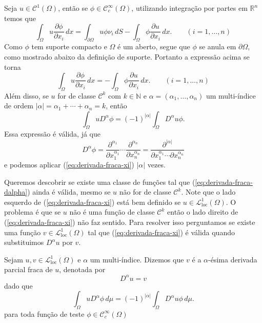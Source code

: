 \documentclass[a4paper, 11pt]{book}
\theoremstyle{definition}
\newcommand{\bN}{\mathbb{N}}
\newcommand{\bR}{\mathbb{R}}
\newcommand{\cC}{\mathcal{C}}
\newcommand{\cL}{\mathcal{L}}
\begin{document}
Seja $u \in \cC^1(\Omega)$, então se $\phi \in \cC^\infty_c(\Omega)$, utilizando integração por partes em $\bR^n$ temos que
\[
    \int_\Omega u \dfrac{\partial \phi}{\partial x_i} \,dx = \int_{\partial\Omega} u\phi \nu_i \, dS- \int_\Omega \phi \dfrac{\partial u}{\partial x_i} \,dx. \qquad (i = 1,\dots,n)
\]
Como $\phi$ tem suporte compacto e $\Omega$ é um aberto, segue que $\phi$ se anula em $\partial\Omega$, como mostrado abaixo da definição de suporte. Portanto a expressão acima se torna
\begin{equation} \label{eq:derivada-fraca-xi}
    \int_\Omega u \dfrac{\partial \phi}{\partial x_i} \,dx = - \int_\Omega \phi \dfrac{\partial u}{\partial x_i} \,dx. \qquad (i = 1,\dots,n)
\end{equation}
Além disso, se $u$ for de classe $\cC^k$ com $k \in \bN$ e $\alpha = (\alpha_1,\dots,\alpha_n)$ um multi-índice de ordem $|\alpha| = \alpha_1 + \cdots + \alpha_n = k$, então
\begin{equation} \label{eq:derivada-fraca-dalpha}
    \int_\Omega u D^\alpha \phi = (-1)^{|\alpha|} \int_\Omega D^\alpha u \phi.
\end{equation}
Essa expressão é válida, já que
\[
    D^\alpha \phi = \dfrac{\partial^{\alpha_1} }{\partial x_1^{\alpha_1}} \cdots \dfrac{\partial^{\alpha_n} }{\partial x_n^{\alpha_n}} = \dfrac{\partial^{|\alpha|} }{\partial x_1^{\alpha_1} \cdots \partial x_n^{\alpha_n}}
\]
e podemos aplicar (\ref{eq:derivada-fraca-xi}) $|\alpha|$ vezes.

Queremos descobrir se existe uma classe de funções tal que (\ref{eq:derivada-fraca-dalpha}) ainda é válida, mesmo se $u$ não for de classe $\cC ^k$. Note que o lado esquerdo de (\ref{eq:derivada-fraca-xi}) está bem definido se $u \in \cL^1_{\mathrm{loc}}(\Omega)$.
O problema é que se $u$ não é uma função de classe $\cC^k$ então o lado direito de (\ref{eq:derivada-fraca-xi}) não faz sentido. Para resolver isso perguntamos se existe uma função $v \in \cL^1_{\mathrm{loc}}(\Omega)$ tal que (\ref{eq:derivada-fraca-xi}) é válida quando substituimos $D^\alpha u$ por $v$.

\begin{dbox}
    Sejam $u,v \in \cL^1_{\mathrm{loc}}(\Omega)$ e $\alpha$ um multi-índice. Dizemos que $v$ é a $\alpha$-ésima derivada parcial fraca de $u$, denotada por
    \[
        D^\alpha u = v
    \]
    dado que
    \begin{equation} \label{eq:derivada-fraca}
        \int_\Omega u D^\alpha \phi \,d\mu = (-1)^{|\alpha|} \int_\Omega D^\alpha u \phi \,d\mu.
    \end{equation}
    para toda função de teste $\phi \in \cC ^\infty_c(\Omega)$
\end{dbox}
\end{document}
